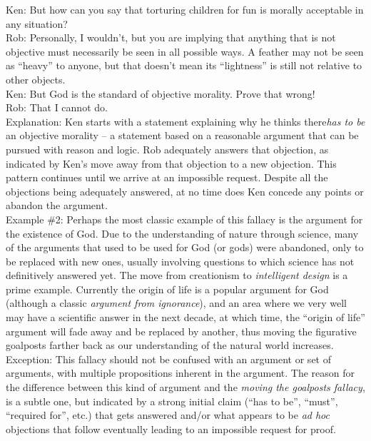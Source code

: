 \documentclass[a4paper,12pt,single,pdftex]{scrbook}
\begin{document}
    
      Ken: But how can you say that torturing children for fun is morally acceptable in any situation?
    \\

    
      Rob: Personally, I wouldn’t, but you are implying that anything that is not objective must necessarily be seen in all possible ways. A feather may not be seen as “heavy” to anyone, but that doesn’t mean its “lightness” is still not relative to other objects.
    \\

    
      Ken: But God is the standard of objective morality.  Prove that wrong!
    \\

    
      Rob: That I cannot do.
    \\

    
      Explanation: Ken starts with a statement explaining why he thinks there{\it  has to be} an objective morality -- a statement based on a reasonable argument that can be pursued with reason and logic.  Rob adequately answers that objection, as indicated by Ken’s move away from that objection to a new objection.  This pattern continues until we arrive at an impossible request.  Despite all the objections being adequately answered, at no time does Ken concede any points or abandon the argument.
    \\

    
      Example \#2: Perhaps the most classic example of this fallacy is the argument for the existence of God.  Due to the understanding of nature through science, many of the arguments that used to be used for God (or gods) were abandoned, only to be replaced with new ones, usually involving questions to which science has not definitively answered yet.  The move from creationism to {\it intelligent design} is a prime example.  Currently the origin of life is a popular argument for God (although a classic {\it argument from ignorance}), and an area where we very well may have a scientific answer in the next decade, at which time, the “origin of life” argument will fade away and be replaced by another, thus moving the figurative goalposts farther back as our understanding of the natural world increases.
    \\

    
      Exception: This fallacy should not be confused with an argument or set of arguments, with multiple propositions inherent in the argument.  The reason for the difference between this kind of argument and the {\it moving the goalposts fallacy}, is a subtle one, but indicated by a strong initial claim (“has to be”, “must”, “required for”, etc.) that gets answered and/or what appears to be {\it ad hoc} objections that follow eventually leading to an impossible request for proof.
    \\
\end{document}
